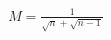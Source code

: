 \documentclass[preview]{standalone}
\begin{document}
\begin{align*}
M = \frac{1}{\sqrt{n} + \sqrt{n - 1}}
\end{align*}
\end{document}
